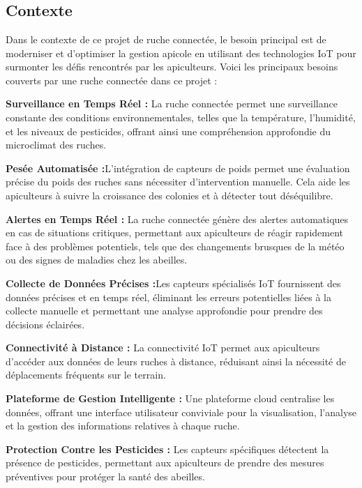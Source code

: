 \documentclass[a4paper,12pt]{report}
\begin{document}
	\pagestyle{empty}
	\chapter{ }
	\section*{Contexte }
	Dans le contexte de ce projet de ruche connectée, le besoin principal est de moderniser et d'optimiser la gestion apicole en utilisant des technologies IoT pour surmonter les défis rencontrés par les apiculteurs. Voici les principaux besoins couverts par une ruche connectée dans ce projet :
	
	\textbf{Surveillance en Temps Réel :} La ruche connectée permet une surveillance constante des conditions environnementales, telles que la température, l'humidité, et les niveaux de pesticides, offrant ainsi une compréhension approfondie du microclimat des ruches.
	
	\textbf{Pesée Automatisée :}L'intégration de capteurs de poids permet une évaluation précise du poids des ruches sans nécessiter d'intervention manuelle. Cela aide les apiculteurs à suivre la croissance des colonies et à détecter tout déséquilibre.
	
	
	\textbf{Alertes en Temps Réel :} La ruche connectée génère des alertes automatiques en cas de situations critiques, permettant aux apiculteurs de réagir rapidement face à des problèmes potentiels, tels que des changements brusques de la météo ou des signes de maladies chez les abeilles.
	
	\textbf{Collecte de Données Précises :}Les capteurs spécialisés IoT fournissent des données précises et en temps réel, éliminant les erreurs potentielles liées à la collecte manuelle et permettant une analyse approfondie pour prendre des décisions éclairées.
	
	\textbf{Connectivité à Distance :} La connectivité IoT permet aux apiculteurs d'accéder aux données de leurs ruches à distance, réduisant ainsi la nécessité de déplacements fréquents sur le terrain.
	
	\textbf{Plateforme de Gestion Intelligente :} Une plateforme cloud centralise les données, offrant une interface utilisateur conviviale pour la visualisation, l'analyse et la gestion des informations relatives à chaque ruche.
	
	\textbf{Protection Contre les Pesticides :} Les capteurs spécifiques détectent la présence de pesticides, permettant aux apiculteurs de prendre des mesures préventives pour protéger la santé des abeilles.
	
\end{document}
